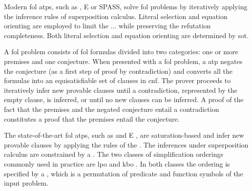 
Modern \gls{fol} \glspl{atp}, such as \Vampire{}, E or SPASS,
solve \gls{fol} problems by iteratively applying the inference rules of superposition calculus.
Literal selection and equation orienting are employed to limit the ... while preserving the refutation completeness.
Both literal selection and equation orienting are determined by \gls{sot}.

A \gls{fol} problem consists of \gls{fol} formulas divided into two categories:
one or more premises and one conjecture.
When presented with a \gls{fol} problem,
a  \gls{atp} negates the conjecture (as a first step of proof by contradiction)
and converts all the formulas into an equisatisfiable set of clauses in \gls{cnf}.
The prover proceeds to iteratively infer new provable clauses
until a contradiction, represented by the empty clause, is inferred,
or until no new clauses can be inferred.
A proof of the fact that the premises and the negated conjecture entail a contradiction
constitutes a proof that the premises entail the conjecture.

The state-of-the-art \gls{fol} \glspl{atp},
such as \Vampire{} \cite{10.1007/978-3-642-39799-8_1} and E \cite{Schulz2019},
are saturation-based and
infer new provable clauses by applying the rules of the .
The inferences under superposition calculus are constrained by a .
The two classes of simplification orderings commonly used in practice are
\gls{lpo} \cite{Kamin1980} and \gls{kbo} \cite{Knuth1983}.
In both classes the ordering is specified by a ,
which is a permutation of predicate and function symbols of the input problem.

